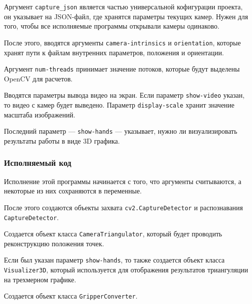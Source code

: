 \documentclass[12pt, a4paper]{article}
\begin{document}
Аргумент \texttt{capture\_json} является частью универсальной кофигурации
проекта, он указывает на JSON-файл, где хранятся параметры текущих камер. Нужен
для того, чтобы все исполняемые программы открывали камеры одинаково.

После этого, вводятся аргументы \texttt{camera-intrinsics} и
\texttt{orientation}, которые хранят пути к файлам внутренних параметров,
положения и ориентации.

Аргумент \texttt{num-threads} принимает значение потоков, которые будут
выделены OpenCV для расчетов.

Вводятся параметры вывода видео на экран. Если параметр \texttt{show-video}
указан, то видео с камер будет выведено. Параметр \texttt{display-scale} хранит
значение масштаба изображений. 

Последний параметр --- \texttt{show-hands} --- указывает, нужно ли
визуализировать результаты работы в виде 3D графика.

\subsubsection{Исполняемый код}
Исполнение этой программы начинается с того, что аргументы считываются, а
некоторые из них сохраняются в переменные.

После этого создаются объекты захвата \texttt{cv2.CaptureDetector} и
распознавания \texttt{CaptureDetector}.

Создается объект класса \texttt{CameraTriangulator}, который будет проводить
реконструкцию положения точек. 

Если был указан параметр \texttt{show-hands}, то также создается объект класса
\texttt{Visualizer3D}, который используется для отображения результатов
триангуляции на трехмерном графике.

Создается объект класса \texttt{GripperConverter}.
\end{document}
